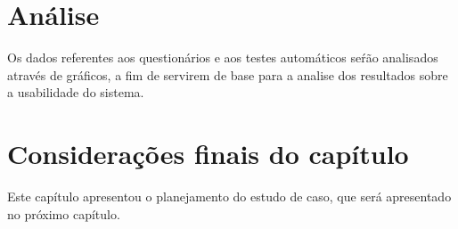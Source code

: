 
\section{Análise}

Os dados referentes aos questionários e aos testes automáticos seŕão analisados através de gráficos, a fim de servirem de base para a analise dos resultados sobre a usabilidade do sistema.

\section{Considerações finais do capítulo}

Este capítulo apresentou o planejamento do estudo de caso, que será apresentado no próximo capítulo.